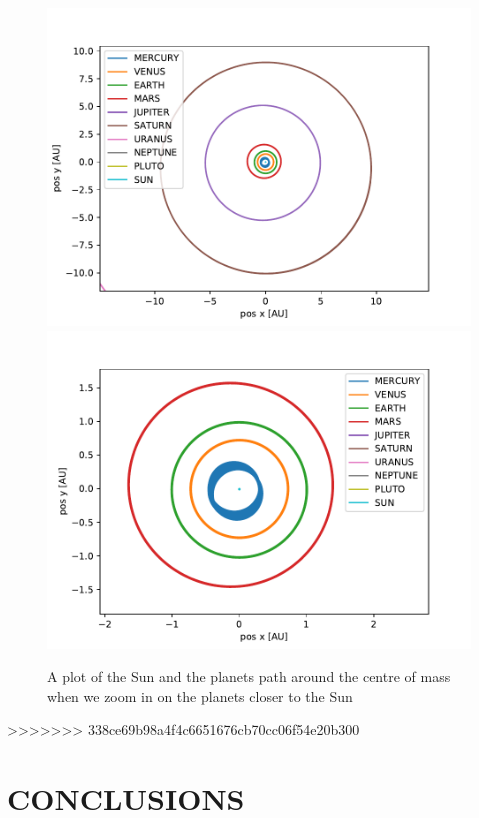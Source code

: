 \documentclass[a4paper]{article}
\begin{document}
\begin{figure}[h!]
	\centering 
	\includegraphics[scale=0.56]{../opp_f2.pdf}
	\includegraphics[scale=0.56]{../opp_f3.pdf}
	\caption{A plot of the Sun and the planets path around the centre of mass when we zoom in on the planets closer to the Sun}
	\label{f_1_1}
\end{figure}

>>>>>>> 338ce69b98a4f4c6651676cb70cc06f54e20b300


\section{CONCLUSIONS}
\end{document}
